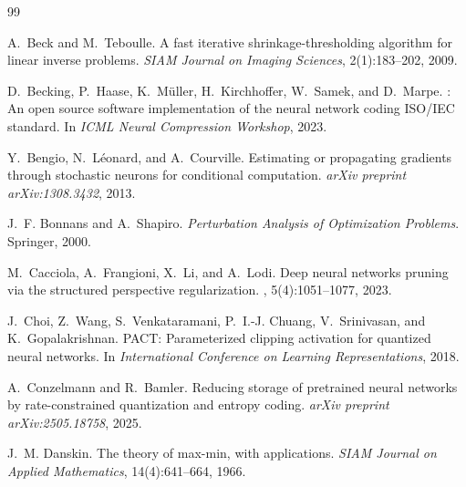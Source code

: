 \documentclass{article}
\begin{document}
{\small
\begin{thebibliography}{99}

A.~Beck and M.~Teboulle.
\newblock A fast iterative shrinkage-thresholding algorithm for linear inverse
problems.
\newblock \emph{SIAM Journal on Imaging Sciences}, 2(1):183--202, 2009.

D.~Becking, P.~Haase, K.~M{\"u}ller, H.~Kirchhoffer, W.~Samek, and D.~Marpe.
: An open source software implementation of the neural
  network coding {ISO/IEC} standard.
\newblock In \emph{ICML Neural Compression Workshop}, 2023.

Y.~Bengio, N.~L\'eonard, and A.~Courville.
\newblock Estimating or propagating gradients through stochastic neurons for
conditional computation.
\newblock \emph{arXiv preprint arXiv:1308.3432}, 2013.

J.~F. Bonnans and A.~Shapiro.
\newblock \emph{Perturbation Analysis of Optimization Problems}.
\newblock Springer, 2000.

M.~Cacciola, A.~Frangioni, X.~Li, and A.~Lodi.
\newblock Deep neural networks pruning via the structured perspective regularization.
, 5(4):1051--1077, 2023.

J.~Choi, Z.~Wang, S.~Venkataramani, P.~I.-J. Chuang, V.~Srinivasan, and
K.~Gopalakrishnan.
\newblock PACT: Parameterized clipping activation for quantized neural networks.
\newblock In \emph{International Conference on Learning Representations}, 2018.

A.~Conzelmann and R.~Bamler.
\newblock Reducing storage of pretrained neural networks by rate-constrained
  quantization and entropy coding.
\newblock \emph{arXiv preprint arXiv:2505.18758}, 2025.

J.~M. Danskin.
\newblock The theory of max-min, with applications.
\newblock \emph{SIAM Journal on Applied Mathematics}, 14(4):641--664, 1966.


\end{thebibliography}}
\end{document}
